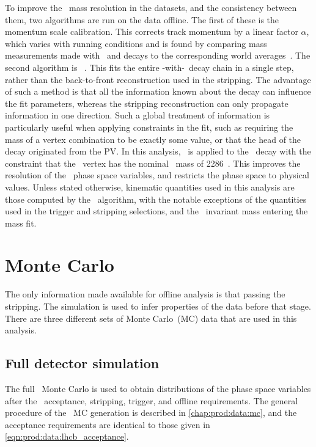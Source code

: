 To improve the \PLambdac\ mass resolution in the datasets, and the consistency 
between them, two algorithms are run on the data offline.
The first of these is the momentum scale calibration.
This corrects track momentum by a linear factor $\alpha$, which varies with 
running conditions and is found by comparing mass measurements made with 
\JpsiTomumu\ and \decay{\PBplus}{\PJpsi\PKplus} decays to the corresponding 
world averages~\cite{Aaij:2014jba}.
The second algorithm is \decaytreefitter~\cite{Hulsbergen:2005pu}.
This fits the entire \LbToLcmuX-with-\LcTophh\ decay chain in a single step, 
rather than the back-to-front reconstruction used in the stripping.
The advantage of such a method is that all the information known about the 
decay can influence the fit parameters, whereas the stripping reconstruction 
can only propagate information in one direction.
Such a global treatment of information is particularly useful when applying 
constraints in the fit, such as requiring the mass of a vertex combination to 
be exactly some value, or that the head of the decay originated from the 
\ac{PV}.
In this analysis, \decaytreefitter\ is applied to the \PLambdab\ decay with the 
constraint that the \phh\ vertex has the nominal \PLambdac\ mass of 
\SI{2286}{\MeVcc}~\cite{PDG2014}.
This improves the resolution of the \PLambdac\ phase space variables, and 
restricts the phase space to physical values.
Unless stated otherwise, kinematic quantities used in this analysis are those 
computed by the \decaytreefitter\ algorithm, with the notable exceptions of the 
quantities used in the trigger and stripping selections, and the \phh\ 
invariant mass entering the mass fit.

\section{Monte Carlo}
\label{chap:cpv:data:mc}

The only information made available for offline analysis is that passing the 
stripping.
The simulation is used to infer properties of the data before that stage.
There are three different sets of Monte Carlo~(MC) data that are used in this 
analysis.

\subsection{Full detector simulation}
\label{chap:cpv:data:mc:full}

The full \lhcb\ Monte Carlo is used to obtain distributions of the phase space 
variables after the \lhcb\ acceptance, stripping, trigger, and offline 
requirements.
The general procedure of the \lhcb\ \ac{MC} generation is described in 
\cref{chap:prod:data:mc}, and the acceptance requirements are identical to 
those given in \cref{eqn:prod:data:lhcb_acceptance}.

